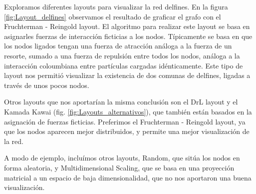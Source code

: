 \par Exploramos diferentes layouts para visualizar la red delfines.
En la figura \ref{fig:Layout_delfines} observamos el resultado de graficar
el grafo con el Fruchterman - Reingold layout. El algoritmo para realizar este layout se basa en asignarles fuerzas de interacción ficticias a los nodos. Típicamente se basa en que los nodos ligados tengan una fuerza de atracción análoga a la fuerza de un resorte, sumado a una fuerza de repulsión entre todos los nodos, análoga a la interacción coloumbiana entre partículas cargadas idénticamente. Este tipo de layout nos permitió visualizar la existencia de dos comunas de delfines, ligadas a través de unos pocos nodos.
\par Otros layouts que nos aportarían la misma conclusión son el DrL layout y el Kamada Kawai (fig. \ref{fig:Layouts_alternativos}), que también están basados en la asignación de fuerzas ficticias. Preferimos el Fruchterman - Reingold layout, ya que los nodos aparecen mejor distribuidos, y permite una mejor visualización de la red.
\par A modo de ejemplo, incluímos otros layouts, Random, que sitúa los nodos en forma aleatoria, y Multidimensional Scaling, que se basa en una proyección matricial a un espacio de baja dimensionalidad, que no nos aportaron una buena visualización.

